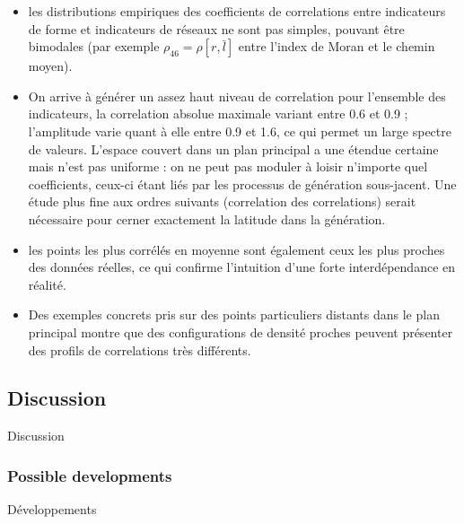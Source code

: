 {\begin{itemize}
\item les distributions empiriques des coefficients de correlations entre indicateurs de forme et indicateurs de réseaux ne sont pas simples, pouvant être bimodales (par exemple $\rho_{46}=\rho[r,\bar{l}]$ entre l'index de Moran et le chemin moyen). 

\item On arrive à générer un assez haut niveau de correlation pour l'ensemble des indicateurs, la correlation absolue maximale variant entre 0.6 et 0.9 ; l'amplitude varie quant à elle entre 0.9 et 1.6, ce qui permet un large spectre de valeurs. L'espace couvert dans un plan principal a une étendue certaine mais n'est pas uniforme : on ne peut pas moduler à loisir n'importe quel coefficients, ceux-ci étant liés par les processus de génération sous-jacent. Une étude plus fine aux ordres suivants (correlation des correlations) serait nécessaire pour cerner exactement la latitude dans la génération.
\item les points les plus corrélés en moyenne sont également ceux les plus proches des données réelles, ce qui confirme l'intuition d'une forte interdépendance en réalité.
\item Des exemples concrets pris sur des points particuliers distants dans le plan principal montre que des configurations de densité proches peuvent présenter des profils de correlations très différents.
\end{itemize}
}







\subsection{Discussion}{Discussion}


\subsubsection{Possible developments}{Développements}


